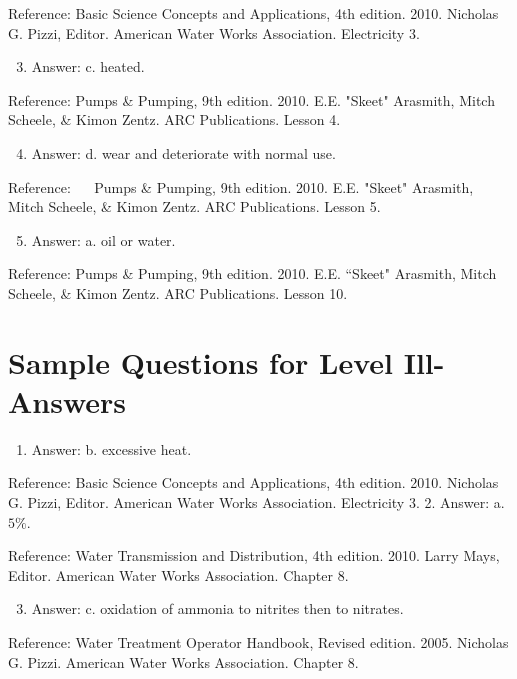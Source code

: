 \documentclass[10pt]{article}
\begin{document}
Reference: Basic Science Concepts and Applications, 4th edition. 2010. Nicholas G. Pizzi, Editor. American Water Works Association. Electricity 3.

\begin{enumerate}
  \setcounter{enumi}{2}
  \item Answer: c. heated.
\end{enumerate}

Reference: Pumps \& Pumping, 9th edition. 2010. E.E. "Skeet" Arasmith, Mitch Scheele, \& Kimon Zentz. ARC Publications. Lesson 4.

\begin{enumerate}
  \setcounter{enumi}{3}
  \item Answer: d. wear and deteriorate with normal use.
\end{enumerate}

Reference: $\quad$ Pumps \& Pumping, 9th edition. 2010. E.E. "Skeet" Arasmith, Mitch Scheele, \& Kimon Zentz. ARC Publications. Lesson 5.

\begin{enumerate}
  \setcounter{enumi}{4}
  \item Answer: a. oil or water.
\end{enumerate}

Reference: Pumps \& Pumping, 9th edition. 2010. E.E. “Skeet" Arasmith, Mitch Scheele, \& Kimon Zentz. ARC Publications. Lesson 10.

\section{Sample Questions for Level Ill-Answers}
\begin{enumerate}
  \item Answer: b. excessive heat.
\end{enumerate}

Reference: Basic Science Concepts and Applications, 4th edition. 2010. Nicholas G. Pizzi, Editor. American Water Works Association. Electricity 3. 2. Answer: a. $5 \%$.

Reference: Water Transmission and Distribution, 4th edition. 2010. Larry Mays, Editor. American Water Works Association. Chapter 8.

\begin{enumerate}
  \setcounter{enumi}{2}
  \item Answer: c. oxidation of ammonia to nitrites then to nitrates.
\end{enumerate}

Reference: Water Treatment Operator Handbook, Revised edition. 2005. Nicholas G. Pizzi. American Water Works Association. Chapter 8.
\end{document}
